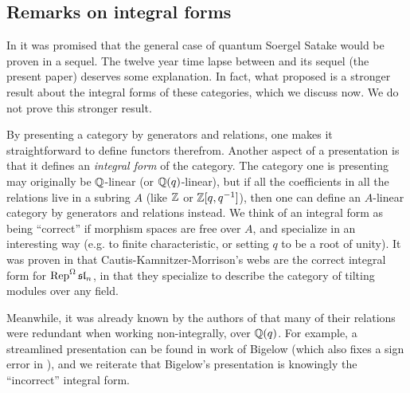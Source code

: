 \subsection{Remarks on integral forms}\label{subsec:youthfuloptimism}

In \cite{EQuantumI} it was promised that the general case of quantum Soergel Satake would be proven in a sequel. The twelve year time lapse between \cite{EQuantumI} and its sequel (the present paper) deserves some explanation. In fact, what \cite{EQuantumI} proposed is a stronger result about the integral forms of these categories, which we discuss now. We do not prove this stronger result.


By presenting a category by generators and relations, one makes it straightforward to define functors therefrom. Another aspect of a presentation is that it defines an \emph{integral form} of the category. The category one is presenting may originally be $\mathbb{Q}$-linear (or $\mathbb{Q}(q)$-linear), but if all the coefficients in all the relations live in a subring $A$ (like $\mathbb{Z}$ or $\mathbb{Z}[q,q^{-1}]$), then one can define an $A$-linear category by generators and relations instead. We think of an integral form as being ``correct'' if morphism spaces are free over $A$, and specialize in an interesting way (e.g. to finite characteristic, or setting $q$ to be a root of unity). It was proven in \cite{ELLCC} that Cautis-Kamnitzer-Morrison's webs are the correct integral form for $\operatorname{Rep}^{\Omega}\mathfrak{sl}_n$, in that they specialize to describe the category of tilting modules over any field.

Meanwhile, it was already known by the authors of \cite{CKM} that many of their relations were redundant when working non-integrally, over $\mathbb{Q}(q)$. For example, a streamlined presentation can be found in work of Bigelow \cite{Bigelow} (which also fixes a sign error in \cite{CKM}), and we reiterate that Bigelow's presentation is knowingly the ``incorrect'' integral form.

